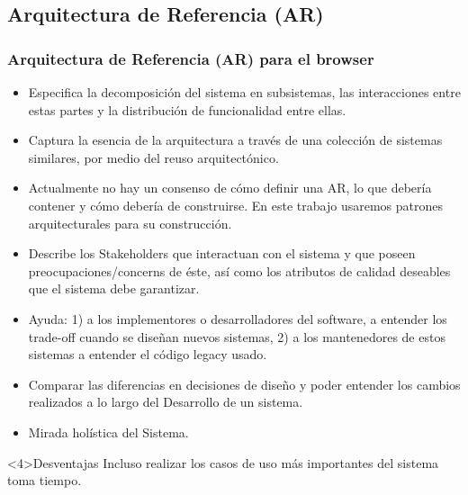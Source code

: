 \documentclass[serif,9pt]{beamer}
\begin{document}
\subsection{Arquitectura de Referencia (AR)}
\begin{frame}
	\frametitle{Arquitectura de Referencia (AR) para el browser}
		\begin{itemize}
			\item<1> Especifica la decomposici\'on del sistema en subsistemas, las interacciones entre estas partes y la distribuci\'on de funcionalidad entre ellas. 
			\item<1> Captura la esencia de la arquitectura a trav\'es de una colecci\'on de sistemas similares, por medio del reuso arquitect\'onico.
			\item<1> Actualmente no hay un consenso de cómo definir una AR, lo que debería contener y cómo debería de construirse. En este trabajo usaremos patrones arquitecturales para su construcción.
			\item<2> Describe los Stakeholders que interactuan con el sistema y que poseen preocupaciones/concerns de \'este, así como los atributos de calidad deseables que el sistema debe garantizar.
			\item<2> Ayuda: 1) a los implementores o desarrolladores del software, a entender los trade-off cuando se diseñan nuevos sistemas, 2) a los mantenedores de estos sistemas a entender el c\'odigo legacy usado.
			\item<2> Comparar las diferencias en decisiones de diseño y poder entender los cambios realizados a lo largo del Desarrollo de un sistema.
			\item<3> Mirada hol\'istica del Sistema.
		\end{itemize}
	\begin{block}{Desventajas}
		Incluso realizar los casos de uso más importantes del sistema toma tiempo.
	\end{block}
\end{frame}
\end{document}
